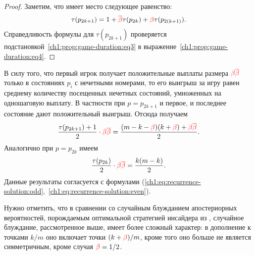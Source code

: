 {\begin{proof}
  Заметим, что имеет место следующее равенство:
  \begin{equation}
    \label{ch1:prop:game-duration:eq4}
    \tau(p_{2k+1}) = 1 + \textcolor{red}{{\overline{\beta}}} \tau(p_{2k}) + \textcolor{red}{\beta} \tau(p_{2(k+1)}).
  \end{equation}
  Справедливость формулы для $\tau(p_{2k+1})$ проверяется подстановкой~\eqref{ch1:prop:game-duration:eq3} в выражение~\eqref{ch1:prop:game-duration:eq4}.
\end{proof}

В силу того, что первый игрок получает положительные выплаты размера $\textcolor{red}{\beta}\textcolor{red}{{\overline{\beta}}}$ только в состояниях $p_i$ с нечетными номерами, то его выигрыш за игру равен среднему количеству посещенных нечетных состояний, умноженных на одношаговую выплату. В частности при $p = p_{2k+1}$ и первое, и последнее состояние дают положительный выигрыш. Отсюда получаем
\begin{equation*}
  \frac{\tau(p_{2k+1}) + 1}{2} \cdot \textcolor{red}{\beta}\textcolor{red}{{\overline{\beta}}} = \frac{(m-k-\textcolor{red}{\beta})(k+\textcolor{red}{\beta}) + \textcolor{red}{\beta}\textcolor{red}{{\overline{\beta}}}}{2}.
\end{equation*}
Аналогично при $p = p_{2k}$ имеем
\begin{equation*}
  \frac{\tau(p_{2k})}{2} \cdot \textcolor{red}{\beta}\textcolor{red}{{\overline{\beta}}} = \frac{k(m-k)}{2}.
\end{equation*}
Данные результаты согласуется с формулами (\ref{ch1:eq:recurrence-solution:odd},~\ref{ch1:eq:recurrence-solution:even}).

Нужно отметить, что в сравнении со случайным блужданием апостериорных вероятностей, порождаемым оптимальной стратегией инсайдера из \cite{domansky07}, случайное блуждание, рассмотренное выше, имеет более сложный характер: в дополнение к точками $k/m$ оно включает точки $(k+\textcolor{red}{\beta})/m$, кроме того оно больше не является симметричным, кроме случая $\textcolor{red}{\beta} = 1/2$.

}
